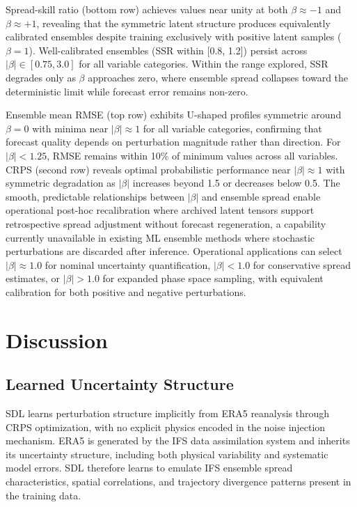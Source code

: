 \documentclass[11pt]{article}
\begin{document}
Spread-skill ratio (bottom row) achieves values near unity at both $\beta \approx -1$ and $\beta \approx +1$, revealing that the symmetric latent structure produces equivalently calibrated ensembles despite training exclusively with positive latent samples ($\beta = 1$). Well-calibrated ensembles (SSR within [0.8, 1.2]) persist across $|\beta| \in [0.75, 3.0]$ for all variable categories. Within the range explored, SSR degrades only as $\beta$ approaches zero, where ensemble spread collapses toward the deterministic limit while forecast error remains non-zero.

Ensemble mean RMSE (top row) exhibits U-shaped profiles symmetric around $\beta = 0$ with minima near $|\beta| \approx 1$ for all variable categories, confirming that forecast quality depends on perturbation magnitude rather than direction. For $|\beta| < 1.25$, RMSE remains within 10\% of minimum values across all variables. CRPS (second row) reveals optimal probabilistic performance near $|\beta| \approx 1$ with symmetric degradation as $|\beta|$ increases beyond 1.5 or decreases below 0.5. The smooth, predictable relationships between $|\beta|$ and ensemble spread enable operational post-hoc recalibration where archived latent tensors support retrospective spread adjustment without forecast regeneration, a capability currently unavailable in existing ML ensemble methods where stochastic perturbations are discarded after inference. Operational applications can select $|\beta| \approx 1.0$ for nominal uncertainty quantification, $|\beta| < 1.0$ for conservative spread estimates, or $|\beta| > 1.0$ for expanded phase space sampling, with equivalent calibration for both positive and negative perturbations.

\section{Discussion}

\subsection{Learned Uncertainty Structure}

SDL learns perturbation structure implicitly from ERA5 reanalysis through CRPS optimization, with no explicit physics encoded in the noise injection mechanism. ERA5 is generated by the IFS data assimilation system and inherits its uncertainty structure, including both physical variability and systematic model errors. SDL therefore learns to emulate IFS ensemble spread characteristics, spatial correlations, and trajectory divergence patterns present in the training data.
\end{document}
